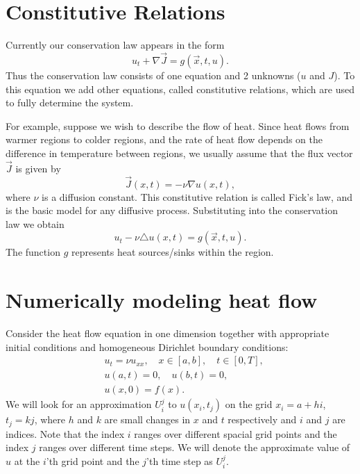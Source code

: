 \section*{Constitutive Relations}
Currently our conservation law appears in the form
\[u_t + \nabla \vec{J} = g(\vec{x},t,u).\]
Thus the conservation law consists of one equation and 2 unknowns ($u$ and $J$).
To this equation we add other equations, called constitutive relations, which are used to fully determine the system.

For example, suppose we wish to describe the flow of heat.
Since heat flows from warmer regions to colder regions, and the rate of heat flow depends on the difference in temperature between regions, we usually assume that the flux vector $\vec{J}$ is given by
\[\vec{J}(x,t) = -\nu \nabla u(x,t),\]
where $\nu$ is a diffusion constant.
This constitutive relation is called Fick's law, and is the basic model for any diffusive process.
Substituting into the conservation law we obtain
\[u_t -\nu \triangle u(x,t) = g(\vec{x},t,u).\]
The function $g$ represents heat sources/sinks within the region.

\section*{Numerically modeling heat flow}
Consider the heat flow equation in one dimension together with appropriate initial conditions and homogeneous Dirichlet boundary conditions:
\begin{align*}
	&{ } u_t = \nu u_{xx}, \quad x \in [a,b],\quad t \in [0,T], \\
	&{ } u(a,t) = 0,\quad u(b,t) = 0,\\
	&{ } u(x,0) = f(x).
\end{align*}
We will look for an approximation $U^j_i$ to $u(x_i,t_j)$ on the grid $x_i = a +  hi$, $t_j = kj$, where $h$ and $k$ are small changes in $x$ and $t$ respectively and $i$ and $j$ are indices.
Note that the index $i$ ranges over different spacial grid points and the index $j$ ranges over different time steps.
We will denote the approximate value of $u$ at the $i$'th grid point and the $j$'th time step as $U_i^j$.

